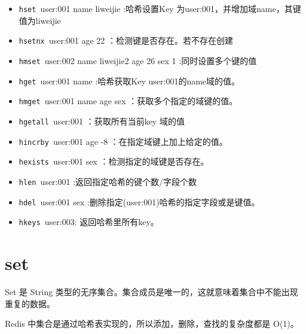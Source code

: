 \documentclass[UTF8,a4paper,12pt]{ctexbook}
\begin{document}
		\begin{itemize}
			\item \verb|hset |user:001 name liweijie :哈希设置Key 为user:001，并增加域name，其键值为liweijie
			\item \verb|hsetnx |user:001 age 22 ：检测键是否存在。若不存在创建
			\item \verb|hmset |user:002 name liweijie2 age 26 sex 1 :同时设置多个键的值
			\item \verb|hget |user:001 name :哈希获取Key user:001的name域的值。
			\item \verb|hmget |user:001 name age sex ：获取多个指定的域键的值。
			\item \verb|hgetall |user:001 ：获取所有当前key 域的值
			\item \verb|hincrby |user:001 age -8 ：在指定域键上加上给定的值。
			\item \verb|hexists |user:001 sex ：检测指定的域键是否存在。
			\item \verb|hlen |user:001 :返回指定哈希的键个数/字段个数
			\item \verb|hdel |user:001 sex :删除指定(user:001)哈希的指定字段或是键值。
			\item \verb|hkeys |user:003: 返回哈希里所有key。
		\end{itemize}		
		
	\section{set}
		Set 是 String 类型的无序集合。集合成员是唯一的，这就意味着集合中不能出现重复的数据。
		
		Redis 中集合是通过哈希表实现的，所以添加，删除，查找的复杂度都是 O(1)。
		
\end{document}
